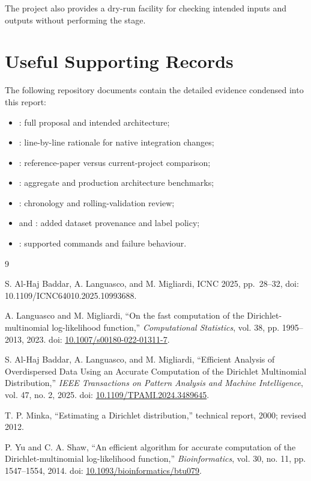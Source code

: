 \documentclass[11pt,a4paper]{article}
\begin{document}
The project also provides a dry-run facility for checking intended inputs and outputs without performing the stage.

\section{Useful Supporting Records}

The following repository documents contain the detailed evidence condensed into this report:

\begin{itemize}
  \item {}: full proposal and intended architecture;
  \item {}: line-by-line rationale for native integration changes;
  \item {}: reference-paper versus current-project comparison;
  \item {}: aggregate and production architecture benchmarks;
  \item {}: chronology and rolling-validation review;
  \item {} and : added dataset provenance and label policy;
  \item {}: supported commands and failure behaviour.
\end{itemize}

\begin{thebibliography}{9}

S. Al-Haj Baddar, A. Languasco, and M. Migliardi,
ICNC 2025, pp.~28--32, doi: 10.1109/ICNC64010.2025.10993688.

A. Languasco and M. Migliardi,
``On the fast computation of the Dirichlet-multinomial log-likelihood function,''
\emph{Computational Statistics}, vol. 38, pp. 1995--2013, 2023.
doi: \href{https://doi.org/10.1007/s00180-022-01311-7}{10.1007/s00180-022-01311-7}.

S. Al-Haj Baddar, A. Languasco, and M. Migliardi,
``Efficient Analysis of Overdispersed Data Using an Accurate Computation of the Dirichlet Multinomial Distribution,''
\emph{IEEE Transactions on Pattern Analysis and Machine Intelligence}, vol. 47, no. 2, 2025.
doi: \href{https://doi.org/10.1109/TPAMI.2024.3489645}{10.1109/TPAMI.2024.3489645}.

T. P. Minka,
``Estimating a Dirichlet distribution,'' technical report, 2000; revised 2012.

P. Yu and C. A. Shaw,
``An efficient algorithm for accurate computation of the Dirichlet-multinomial log-likelihood function,''
\emph{Bioinformatics}, vol. 30, no. 11, pp. 1547--1554, 2014.
doi: \href{https://doi.org/10.1093/bioinformatics/btu079}{10.1093/bioinformatics/btu079}.

\end{thebibliography}
\end{document}
